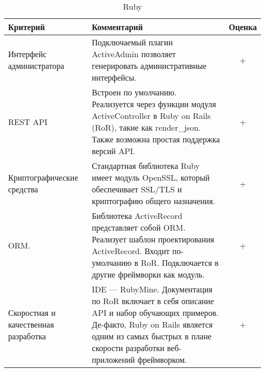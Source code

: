 \bgroup %
\def\arraystretch{1.5}%
  \begin{longtable}{| p{} | p{} | c |} 
  \caption{Ruby} %
  \hline
    Критерий & Комментарий & Оценка \\
  \hline
    Интерфейс администратора

    & Подключаемый плагин ActiveAdmin позволяет генерировать административные интерфейсы.

    & + \\
  \hline
    REST API

    & Встроен по умолчанию. Реализуется через функции модуля ActiveController в Ruby on Rails (RoR), такие как render_json. Также возможна простая поддержка версий API.
    
    & + \\
  \hline
    Криптографические средства

    & Стандартная библиотека Ruby имеет модуль OpenSSL, который обеспечивает SSL/TLS и криптографию общего назначения.

    & + \\
  \hline
    ORM.
    
    & Библиотека ActiveRecord представляет собой ORM. Реализует шаблон проектирования ActiveRecord. Входит по-умолчанию в RoR. Подключается в другие фреймворки как модуль.

    & + \\
  \hline
    Скоростная и качественная разработка
    
    & IDE — RubyMine. Документация по RoR включает в себя описание API и набор обучающих примеров. Де-факто, Ruby on Rails является одним из самых быстрых в плане скорости разработки веб-приложений фреймворком.

    & + \\
  \hline

  \end{longtable}
\egroup %

\pagebreak

